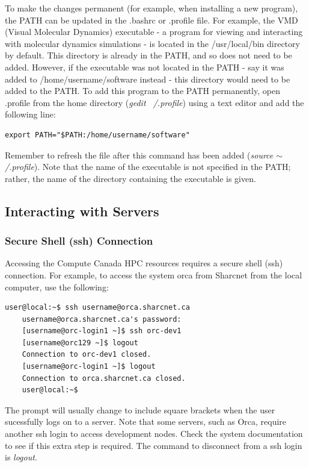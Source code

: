 \documentclass[12pt]{article}
\begin{document}
\quad To make the changes permanent (for example, when installing a new program), the PATH can be updated in the .bashrc or .profile file. For example, the VMD (Visual Molecular Dynamics) executable - a program for viewing and interacting with molecular dynamics simulations - is located in the /usr/local/bin directory by default. This directory is already in the PATH, and so does not need to be added. However, if the executable was not located in the PATH - say it was added to /home/username/software instead - this directory would need to be added to the PATH. To add this program to the PATH permanently, open .profile from the home directory (\textit{gedit ~/.profile}) using a text editor and add the following line:
\begin{lstlisting}[numbers=none]
	export PATH="$PATH:/home/username/software"
\end{lstlisting}
Remember to refresh the file after this command has been added (\textit{source $\sim$/.profile}). Note that the name of the executable is not specified in the PATH; rather, the name of the directory containing the executable is given. 

\subsection{Interacting with Servers}\label{server}

\subsubsection{Secure Shell (ssh) Connection}
\quad\enskip\quad Accessing the Compute Canada HPC resources requires a secure shell (ssh) connection. For example, to access the system orca from Sharcnet from the local computer, use the following:
\begin{lstlisting}[numbers=none]
	user@local:~$ ssh username@orca.sharcnet.ca
	username@orca.sharcnet.ca's password:
	[username@orc-login1 ~]$ ssh orc-dev1
	[username@orc129 ~]$ logout
	Connection to orc-dev1 closed.	
	[username@orc-login1 ~]$ logout
	Connection to orca.sharcnet.ca closed.
	user@local:~$
\end{lstlisting}
The prompt will usually change to include square brackets when the user sucessfully logs on to a server. Note that some servers, such as Orca, require another ssh login to access development nodes. Check the system documentation to see if this extra step is required. The command to disconnect from a ssh login is \textit{logout}.
\end{document}
